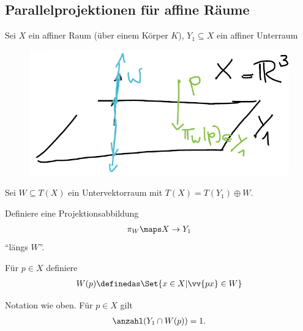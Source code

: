 \subsection*{Parallelprojektionen für affine Räume}
Sei \( X \) ein affiner Raum (über einem Körper \( K \)), \( Y_1\subseteq X \) ein affiner Unterraum
\begin{beispiel*}
    \begin{figure}[H]
        \centering
        \includegraphics[width=0.5\linewidth]{figures/affine_parallelprojektion_r_3}
        \label{fig:affine_parallelprojektion_r_3}
    \end{figure}
    
\end{beispiel*}
Sei \( W\subseteq T(X) \) ein Untervektorraum mit \( T(X)=T(Y_1)\oplus W \).
\begin{ziel*}
    Definiere eine Projektionsabbildung
    \begin{align*}
        \pi_W\maps X\to Y_1
    \end{align*}
    \enquote{längs \( W \)}.
\end{ziel*}
Für \( p\in X \) definiere
\begin{align*}
    W(p)\definedas\Set{x\in X| \vv{px}\in W}
\end{align*}
\begin{lemma}
    Notation wie oben.
    Für \( p\in X \) gilt
    \begin{align*}
        \anzahl(Y_1\cap W(p))=1.
    \end{align*}
\end{lemma}
